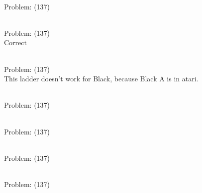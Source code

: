 \documentclass[11pt]{article}
\begin{document}
\begin{minipage}[t]{0.5\textwidth}
  {\centering
  
\\
Problem: (137)\\
  }
\end{minipage}
\begin{minipage}[t]{0.5\textwidth}
  {\centering
  
\\
Problem: (137)\\
Correct\\
  }
\end{minipage}
\begin{minipage}[t]{0.5\textwidth}
  {\centering
  
\\
Problem: (137)\\
This ladder doesn't work for Black, because Black A is in atari.\\
  }
\end{minipage}
\begin{minipage}[t]{0.5\textwidth}
  {\centering
  
\\
Problem: (137)\\
  }
\end{minipage}
\begin{minipage}[t]{0.5\textwidth}
  {\centering
  
\\
Problem: (137)\\
  }
\end{minipage}
\begin{minipage}[t]{0.5\textwidth}
  {\centering
  
\\
Problem: (137)\\
  }
\end{minipage}
\begin{minipage}[t]{0.5\textwidth}
  {\centering
  
\\
Problem: (137)\\
  }
\end{minipage}
\end{document}
